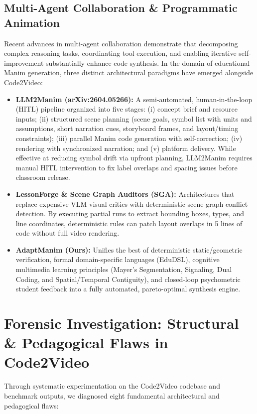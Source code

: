 \documentclass[11pt, a4paper]{article}
\begin{document}
\subsection{Multi-Agent Collaboration \& Programmatic Animation}
Recent advances in multi-agent collaboration demonstrate that decomposing complex reasoning tasks, coordinating tool execution, and enabling iterative self-improvement substantially enhance code synthesis. In the domain of educational Manim generation, three distinct architectural paradigms have emerged alongside Code2Video:
\begin{itemize}[leftmargin=*]
    \item \textbf{LLM2Manim (arXiv:2604.05266):} A semi-automated, human-in-the-loop (HITL) pipeline organized into five stages: (i) concept brief and resource inputs; (ii) structured scene planning (scene goals, symbol list with units and assumptions, short narration cues, storyboard frames, and layout/timing constraints); (iii) parallel Manim code generation with self-correction; (iv) rendering with synchronized narration; and (v) platform delivery. While effective at reducing symbol drift via upfront planning, LLM2Manim requires manual HITL intervention to fix label overlaps and spacing issues before classroom release.
    \item \textbf{LessonForge \& Scene Graph Auditors (SGA):} Architectures that replace expensive VLM visual critics with deterministic scene-graph conflict detection. By executing partial runs to extract bounding boxes, types, and line coordinates, deterministic rules can patch layout overlaps in 5 lines of code without full video rendering.
    \item \textbf{AdaptManim (Ours):} Unifies the best of deterministic static/geometric verification, formal domain-specific languages (EduDSL), cognitive multimedia learning principles (Mayer's Segmentation, Signaling, Dual Coding, and Spatial/Temporal Contiguity), and closed-loop psychometric student feedback into a fully automated, pareto-optimal synthesis engine.
\end{itemize}

\section{Forensic Investigation: Structural \& Pedagogical Flaws in Code2Video}

Through systematic experimentation on the Code2Video codebase and benchmark outputs, we diagnosed eight fundamental architectural and pedagogical flaws:
\end{document}
